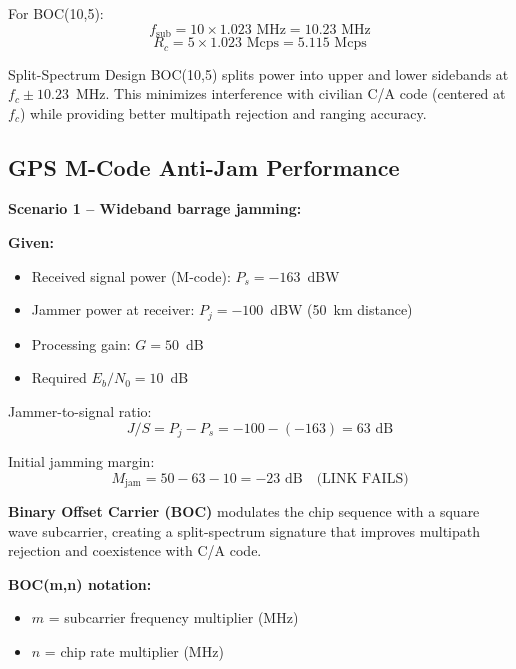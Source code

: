 For BOC(10,5):
\begin{equation}
f_{\text{sub}} = 10 \times 1.023 \text{ MHz} = 10.23 \text{ MHz}
\end{equation}
\begin{equation}
R_c = 5 \times 1.023 \text{ Mcps} = 5.115 \text{ Mcps}
\end{equation}

\begin{calloutbox}{Split-Spectrum Design}
BOC(10,5) splits power into upper and lower sidebands at $f_c \pm 10.23$~MHz. This minimizes interference with civilian C/A code (centered at $f_c$) while providing better multipath rejection and ranging accuracy.
\end{calloutbox}

\subsection{GPS M-Code Anti-Jam Performance}

\textbf{Scenario 1 -- Wideband barrage jamming:}

\textbf{Given:}
\begin{itemize}
\item Received signal power (M-code): $P_s = -163$~dBW
\item Jammer power at receiver: $P_j = -100$~dBW (50~km distance)
\item Processing gain: $G = 50$~dB
\item Required $E_b/N_0 = 10$~dB
\end{itemize}

Jammer-to-signal ratio:
\begin{equation}
J/S = P_j - P_s = -100 - (-163) = 63 \text{ dB}
\end{equation}

Initial jamming margin:
\begin{equation}
M_{\text{jam}} = 50 - 63 - 10 = -23 \text{ dB} \quad \text{(LINK FAILS)}
\end{equation}

\textbf{Binary Offset Carrier (BOC)} modulates the chip sequence with a square wave subcarrier, creating a split-spectrum signature that improves multipath rejection and coexistence with C/A code.

\textbf{BOC(m,n) notation:}
\begin{itemize}
\item $m$ = subcarrier frequency multiplier (MHz)
\item $n$ = chip rate multiplier (MHz)
\end{itemize}

